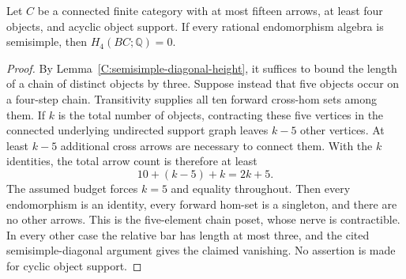\begin{lemma}
\label{C:semisimple-fifteen}
Let $C$ be a connected finite category with at most fifteen
arrows, at least four objects, and acyclic object support.
If every rational endomorphism algebra is semisimple, then
$H_4(BC;\mathbb Q)=0$.
\end{lemma}
\begin{proof}
By Lemma~\ref{C:semisimple-diagonal-height}, it suffices to
bound the length of a chain of distinct objects by three.
Suppose instead that five objects occur on a four-step chain.
Transitivity supplies all ten forward cross-hom sets among them.
If $k$ is the total number of objects, contracting these five
vertices in the connected underlying undirected support graph
leaves $k-5$ other vertices.  At least $k-5$ additional cross
arrows are necessary to connect them.  With the $k$ identities,
the total arrow count is therefore at least
\[
 10+(k-5)+k=2k+5.
\]
The assumed budget forces $k=5$ and equality throughout.
Then every endomorphism is an identity, every forward hom-set
is a singleton, and there are no other arrows.  This is the
five-element chain poset, whose nerve is contractible.
In every other case the relative bar has length at most three,
and the cited semisimple-diagonal argument gives the claimed
vanishing.  No assertion is made for cyclic object support.
\end{proof}
